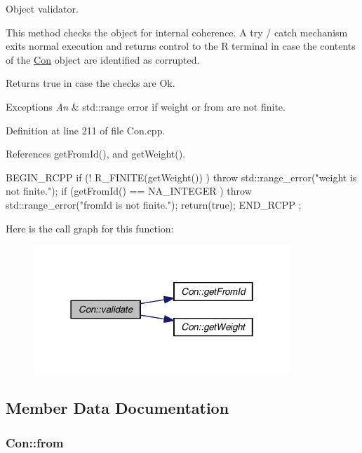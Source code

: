 Object validator. 

This method checks the object for internal coherence. A try / catch mechanism exits normal execution and returns control to the R terminal in case the contents of the \hyperlink{class_con}{Con} object are identified as corrupted. \begin{DoxyReturn}{Returns}
true in case the checks are Ok. 
\end{DoxyReturn}

\begin{DoxyExceptions}{Exceptions}
{\em An} & std::range error if weight or from are not finite. \\
\hline
\end{DoxyExceptions}


Definition at line 211 of file Con.cpp.



References getFromId(), and getWeight().


\begin{DoxyCode}
                    {
        BEGIN_RCPP
        if (! R_FINITE(getWeight()) )           throw std::range_error("weight is
       not finite.");
        if (getFromId() == NA_INTEGER )         throw std::range_error("fromId is
       not finite.");
        return(true);
        END_RCPP
};
\end{DoxyCode}


Here is the call graph for this function:\nopagebreak
\begin{figure}[H]
\begin{center}
\leavevmode
\includegraphics[width=274pt]{class_con_af5f836a7b0988b3d9113589b2959d5e6_cgraph}
\end{center}
\end{figure}




\subsection{Member Data Documentation}
\hypertarget{class_con_a7c05f90dff56fd26c1fa0f042bba67a6}{
\subsubsection[{from}]{ {\bf Con::from}}}
\label{class_con_a7c05f90dff56fd26c1fa0f042bba67a6}


